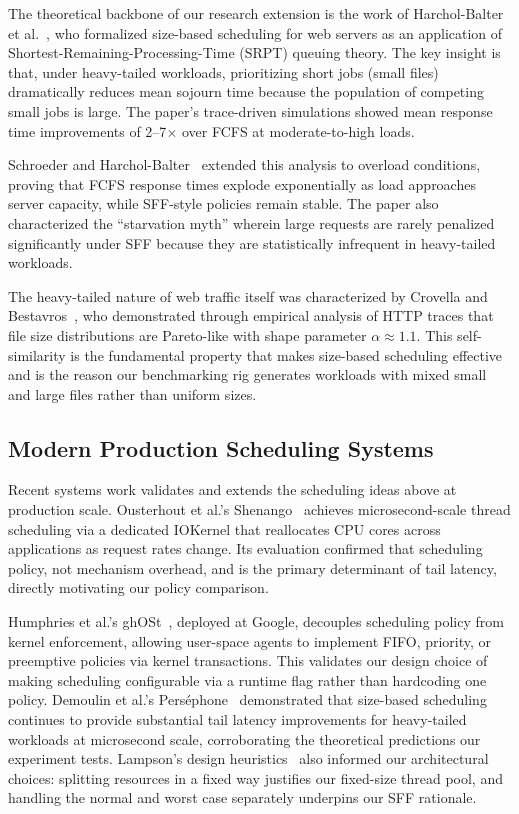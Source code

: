 \documentclass[conference]{IEEEtran}
\begin{document}
The theoretical backbone of our research extension is the work of
Harchol-Balter et al.~\cite{harchol2003}, who formalized size-based
scheduling for web servers as an application of
Shortest-Remaining-Processing-Time (SRPT) queuing theory. The key insight is
that, under heavy-tailed workloads, prioritizing short jobs (small files)
dramatically reduces mean sojourn time because the population of competing
small jobs is large. The paper's trace-driven simulations showed mean response
time improvements of 2--7$\times$ over FCFS at moderate-to-high loads.

Schroeder and Harchol-Balter~\cite{schroeder2006} extended this analysis to
overload conditions, proving that FCFS response times explode exponentially as
load approaches server capacity, while SFF-style policies remain stable. The
paper also characterized the ``starvation myth'' wherein large requests are rarely
penalized significantly under SFF because they are statistically infrequent in heavy-tailed workloads.

The heavy-tailed nature of web traffic itself was characterized by Crovella
and Bestavros~\cite{crovella1997}, who demonstrated through empirical analysis
of HTTP traces that file size distributions are Pareto-like with shape
parameter $\alpha \approx 1.1$. This self-similarity is the fundamental
property that makes size-based scheduling effective and is the reason our
benchmarking rig generates workloads with mixed small and large files rather
than uniform sizes.

\subsection{Modern Production Scheduling Systems}

Recent systems work validates and extends the scheduling ideas above at
production scale. Ousterhout et al.'s Shenango~\cite{ousterhout2019} achieves
microsecond-scale thread scheduling via a dedicated IOKernel that reallocates
CPU cores across applications as request rates change. Its evaluation confirmed
that scheduling policy, not mechanism overhead, and is the primary determinant of tail latency, directly motivating our policy comparison.

Humphries et al.'s ghOSt~\cite{ghost2021}, deployed at Google, decouples
scheduling policy from kernel enforcement, allowing user-space agents to
implement FIFO, priority, or preemptive policies via kernel transactions. This
validates our design choice of making scheduling configurable via a runtime
flag rather than hardcoding one policy. Demoulin et al.'s
Perséphone~\cite{persephone2021} demonstrated that size-based scheduling
continues to provide substantial tail latency improvements for heavy-tailed
workloads at microsecond scale, corroborating the theoretical predictions our
experiment tests. Lampson's design heuristics~\cite{lampson1983} also informed
our architectural choices: splitting resources in a fixed way justifies our
fixed-size thread pool, and handling the normal and worst case separately
underpins our SFF rationale.
\end{document}
